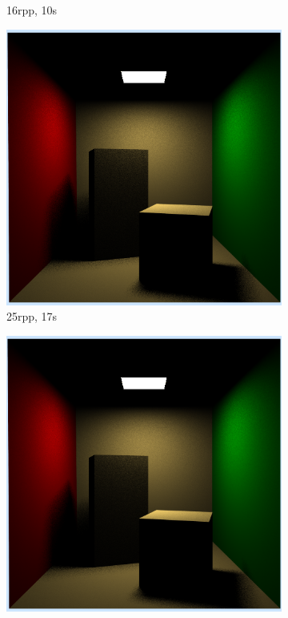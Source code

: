 \begin{figure}[h]
\begin{subfigure}[b]{0.4\textwidth}
		\caption{16rpp, 10s}
	\end{subfigure}
	\begin{subfigure}[b]{0.4\textwidth}
		\includegraphics[width=\textwidth]{week4/arealight_25rpp_17s.png}
		\caption{25rpp, 17s}
	\end{subfigure}
	\begin{subfigure}[b]{0.4\textwidth}
		\includegraphics[width=\textwidth]{week4/arealight_36rpp_22s.png}

\end{subfigure}
\end{figure}

